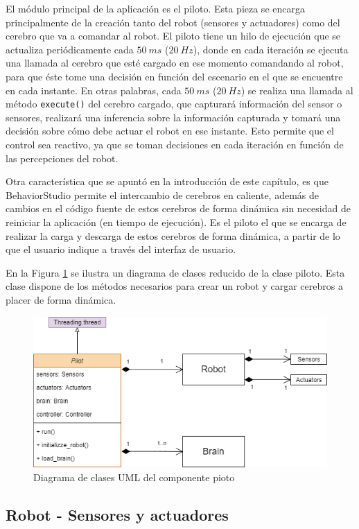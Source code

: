 El módulo principal de la aplicación es el piloto. Esta pieza se encarga principalmente de la creación tanto del robot (sensores y actuadores) como del cerebro que va a comandar al robot. El piloto tiene un hilo de ejecución que se actualiza periódicamente cada $ 50\ ms $ ($ 20\ Hz $), donde en cada iteración se ejecuta una llamada al cerebro que esté cargado en ese momento comandando al robot, para que éste tome una decisión en función del escenario en el que se encuentre en cada instante. En otras palabras, cada $ 50\ ms $ ($ 20\ Hz$) se realiza una llamada al método \lstinline{execute()} del cerebro cargado, que capturará información del sensor o sensores, realizará una inferencia sobre la información capturada y tomará una decisión sobre cómo debe actuar el robot en ese instante. Esto permite que el control sea reactivo, ya que se toman decisiones en cada iteración en función de las percepciones del robot.

Otra característica que se apuntó en la introducción de este capítulo, es que BehaviorStudio permite el intercambio de cerebros en caliente, además de cambios en el código fuente de estos cerebros de forma dinámica sin necesidad de reiniciar la aplicación (en tiempo de ejecución). Es el piloto el que se encarga de realizar la carga y descarga de estos cerebros de forma dinámica, a partir de lo que el usuario indique a través del interfaz de usuario.

En la Figura \ref{fig:pilotuml} se ilustra un diagrama de clases reducido de la clase piloto. Esta clase dispone de los métodos necesarios para crear un robot y cargar cerebros a placer de forma dinámica.

\begin{figure}
  \centering
  \includegraphics[width=.6\linewidth]{img/pilotuml}
  \caption{Diagrama de clases UML del componente pioto}
  \label{fig:pilotuml}
\end{figure}

\subsection{Robot - Sensores y actuadores}

